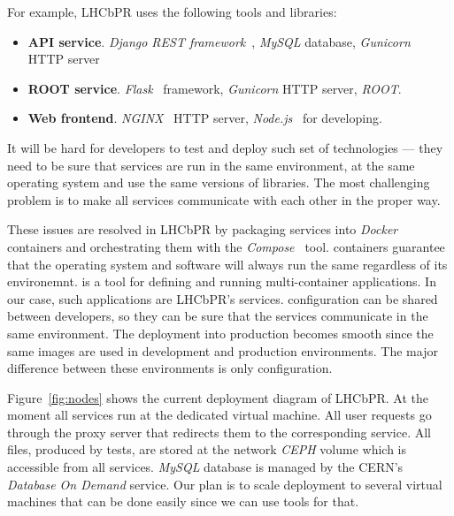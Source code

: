 \documentclass[a4paper]{jpconf}
\begin{document}
For example, LHCbPR uses the following tools and libraries:
\begin{itemize}
\item \textbf{API service}. \textit{Django REST framework}~\cite{rest}, \textit{MySQL}
database, \textit{Gunicorn}~\cite{gunicorn} HTTP server
\item \textbf{ROOT service}. \textit{Flask}~\cite{flask} framework, \textit{Gunicorn} HTTP server, \textit{ROOT}.
\item \textbf{Web frontend}. \textit{NGINX}~\cite{nginx} HTTP server, \textit{Node.js}~\cite{node} for developing.
\end{itemize}

It will be hard for developers to test and deploy  such set of technologies
--- they need to be sure that services are run in the same environment, at
the same operating system and use the same versions of libraries. The most
challenging problem is to make all services communicate with each other in the proper way.

These issues are resolved in LHCbPR by packaging services into
\textit{Docker~\cite{docker}} containers and orchestrating them with the \docker
\textit{Compose~\cite{compose}} tool. \docker containers guarantee that the
operating system and software will always run the same regardless of its
environemnt. \compose is a tool for defining and running multi-container \docker
applications. In our case, such applications are LHCbPR's services. \composes
configuration can be shared between developers, so they can be sure that the
services communicate in the same environment. The deployment into production
becomes  smooth since the same
\docker images are used in development and production environments. The major difference
 between these environments is only \composes configuration.

Figure~\ref{fig:nodes} shows the current deployment diagram of LHCbPR. At the
moment all services run at the dedicated virtual machine. All user requests go
through the proxy server that redirects them to the corresponding service. All
files, produced by tests, are stored at the network \textit{CEPH} volume which
is accessible from all services.
\textit{MySQL} database is managed by the CERN's \textit{Database On Demand}
service. Our plan is  to scale deployment to several virtual machines that can
be done easily since we can use \docker tools for that.  
\end{document}
